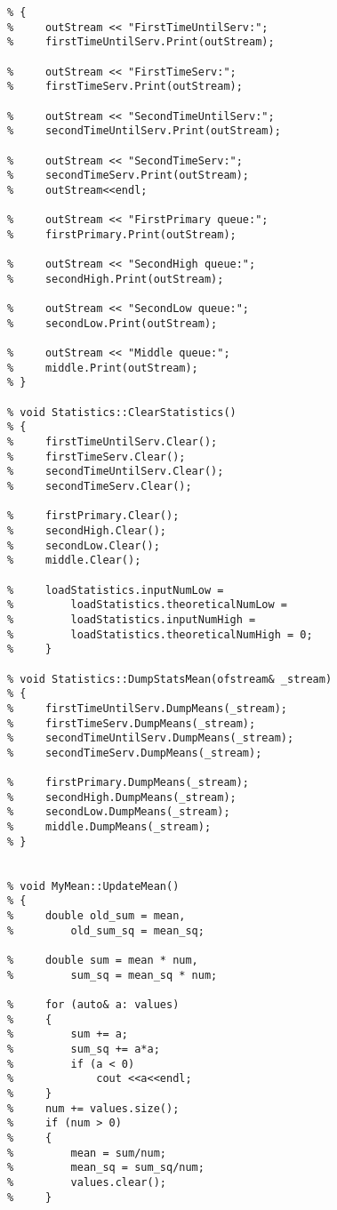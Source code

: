 \begin{lstlisting}[language={[ISO]C++}]
% void Statistics::Print(ostream& outStream)
% {
%     outStream << "FirstTimeUntilServ:";
%     firstTimeUntilServ.Print(outStream);

%     outStream << "FirstTimeServ:";
%     firstTimeServ.Print(outStream);

%     outStream << "SecondTimeUntilServ:";
%     secondTimeUntilServ.Print(outStream);

%     outStream << "SecondTimeServ:";
%     secondTimeServ.Print(outStream);
%     outStream<<endl;

%     outStream << "FirstPrimary queue:";
%     firstPrimary.Print(outStream);

%     outStream << "SecondHigh queue:";
%     secondHigh.Print(outStream);

%     outStream << "SecondLow queue:";
%     secondLow.Print(outStream);

%     outStream << "Middle queue:";
%     middle.Print(outStream);
% }

% void Statistics::ClearStatistics()
% {
%     firstTimeUntilServ.Clear();
%     firstTimeServ.Clear();
%     secondTimeUntilServ.Clear();
%     secondTimeServ.Clear();
    
%     firstPrimary.Clear();
%     secondHigh.Clear();
%     secondLow.Clear();
%     middle.Clear();

%     loadStatistics.inputNumLow =
%         loadStatistics.theoreticalNumLow =
%         loadStatistics.inputNumHigh =
%         loadStatistics.theoreticalNumHigh = 0;
%     }

% void Statistics::DumpStatsMean(ofstream& _stream)
% {
%     firstTimeUntilServ.DumpMeans(_stream);
%     firstTimeServ.DumpMeans(_stream);
%     secondTimeUntilServ.DumpMeans(_stream);
%     secondTimeServ.DumpMeans(_stream);
  
%     firstPrimary.DumpMeans(_stream);
%     secondHigh.DumpMeans(_stream);
%     secondLow.DumpMeans(_stream);
%     middle.DumpMeans(_stream);
% }


% void MyMean::UpdateMean()
% {
%     double old_sum = mean,
%         old_sum_sq = mean_sq;
  
%     double sum = mean * num,
%         sum_sq = mean_sq * num;

%     for (auto& a: values)
%     {
%         sum += a;
%         sum_sq += a*a;
%         if (a < 0)
%             cout <<a<<endl;
%     }
%     num += values.size();
%     if (num > 0)
%     {
%         mean = sum/num;
%         mean_sq = sum_sq/num;
%         values.clear();
%     }


\end{lstlisting}
